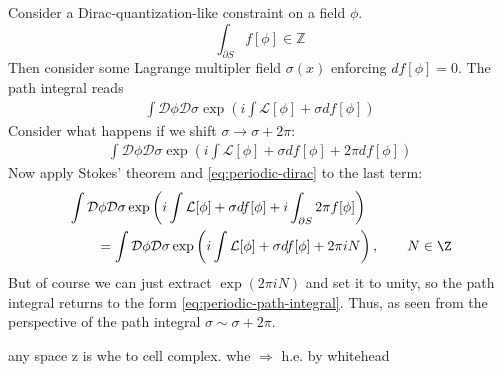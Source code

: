 \documentclass{report}
\begin{document}
Consider a Dirac-quantization-like constraint on a field $ \phi $.
\begin{equation}\label{eq:periodic-dirac}
	\int_{\partial S} f[\phi] \in \mathbb{Z}
\end{equation}
Then consider some Lagrange multipler field $ \sigma(x) $ enforcing 
$ df[\phi] = 0 $. The path integral reads 
\begin{align}\label{eq:periodic-path-integral}
	\int \mathcal{D}\phi \mathcal{D}\sigma 
		\exp\left(i \int \mathcal{L}[\phi] + \sigma df[\phi] \right)
\end{align}
Consider what happens if we shift $ \sigma \to \sigma + 2\pi $:
\begin{align*}
	\int \mathcal{D}\phi \mathcal{D}\sigma 
		\exp\left(i \int \mathcal{L}[\phi] + \sigma df[\phi] + 2\pi df[\phi] \right)
\end{align*}
Now apply Stokes' theorem and \cref{eq:periodic-dirac} to the last term:
\begin{align*}
	&\int \mathcal{D}\phi \mathcal{D}\sigma 
		\exp\left(i \int \mathcal{L}[\phi] + \sigma d f[\phi] + i \int_{\partial S}2\pi f[\phi] \right)\\
		&\qquad
		= 
	\int \mathcal{D}\phi \mathcal{D}\sigma 
		\exp\left(i \int \mathcal{L}[\phi] + \sigma d f[\phi] + 2 \pi i N\right), \qquad N\in \Z
\end{align*}
But of course we can just extract $ \exp(2\pi i N) $ and set it to unity, so 
the path integral returns to the form \cref{eq:periodic-path-integral}.
Thus, as seen from the perspective of the path integral $ \sigma \sim \sigma + 
2\pi $.

any space z is whe to cell complex. whe $ \Longrightarrow $ h.e. by whitehead 



\end{document}
